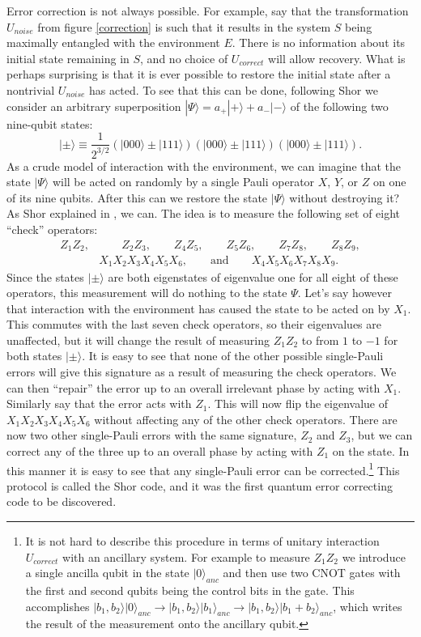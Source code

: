 \documentclass[12pt]{article}
\newcommand{\be}{\begin{equation}}
\newcommand{\ee}{\end{equation}}
\newcommand{\ran}{\rangle}
\begin{document}
Error correction is not always possible.  For example, say that the transformation $U_{noise}$ from figure \ref{correction} is such that it results in the system $S$ being maximally entangled with the environment $E$.  There is no information about its initial state remaining in $S$, and no choice of $U_{correct}$ will allow recovery.  What is perhaps surprising is that it is ever possible to restore the initial state after a nontrivial $U_{noise}$ has acted.  To see that this can be done, following Shor \cite{shor1995scheme} we consider an arbitrary superposition $|\Psi\ran=a_+|+\ran+a_-|-\ran$ of the following two nine-qubit states:
\be
|\pm\ran\equiv \frac{1}{2^{3/2}}\left(|000\ran\pm|111\ran\right)\left(|000\ran\pm|111\ran\right)\left(|000\ran\pm|111\ran\right).
\ee
As a crude model of interaction with the environment, we can imagine that the state $|\Psi\ran$ will be acted on randomly by a single Pauli operator $X$, $Y$, or $Z$ on one of its nine qubits.  After this can we restore the state $|\Psi\ran$ without destroying it?  As Shor explained in \cite{shor1995scheme}, we can.  The idea is to measure the following set of eight ``check'' operators: 
\begin{align}\nonumber
Z_1 Z_2,& \qquad Z_2 Z_3,\qquad Z_4Z_5,\qquad Z_5Z_6,\qquad Z_7Z_8,\qquad Z_8 Z_9,\\
&X_1X_2X_3X_4X_5X_6,\qquad \mathrm{and}\qquad X_4X_5X_6X_7X_8X_9.
\end{align}
Since the states $|\pm\ran$ are both eigenstates of eigenvalue one for all eight of these operators, this measurement will do nothing to the state $\Psi$.  Let's say however that interaction with the environment has caused the state to be acted on by $X_1$.  This commutes with the last seven check operators, so their eigenvalues are unaffected, but it will change the result of measuring $Z_1Z_2$ to from $1$ to $-1$ for both states $|\pm\ran$.  It is easy to see that none of the other possible single-Pauli errors will give this signature as a result of measuring the check operators.  We can then ``repair'' the error up to an overall irrelevant phase by acting with $X_1$.  Similarly say that the error acts with $Z_1$.  This will now flip the eigenvalue of $X_1X_2X_3X_4X_5X_6$ without affecting any of the other check operators.  There are now two other single-Pauli errors with the same signature, $Z_2$ and $Z_3$, but we can correct any of the three up to an overall phase by acting with $Z_1$ on the state.  In this manner it is easy to see that any single-Pauli error can be corrected.\footnote{It is not hard to describe this procedure in terms of unitary interaction $U_{correct}$ with an ancillary system.  For example to measure $Z_1Z_2$ we introduce a single ancilla qubit in the state $|0\ran_{anc}$ and then use two CNOT gates with the first and second qubits being the control bits in the gate.  This accomplishes $|b_1,b_2\ran|0\ran_{anc}\to|b_1,b_2\ran|b_1\ran_{anc}\to|b_1,b_2\ran|b_1+b_2\ran_{anc}$, which writes the result of the measurement onto the ancillary qubit.}  This protocol is called the Shor code, and it was the first quantum error correcting code to be discovered.
\end{document}
